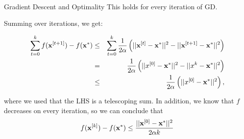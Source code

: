 \documentclass[11pt,compress,t,notes=noshow, xcolor=table]{beamer}
\begin{document}
\begin{vbframe}{Gradient Descent and Optimality}
		This holds for every iteration of GD. 
		
		\framebreak 
		
		Summing over iterations, we get: 
		
		\begin{eqnarray*}
			\sum_{t = 0}^{k} f(\mathbf{x}^{[t+1]}) - f(\mathbf{x}^\ast) &\leq& \sum_{t= 0}^{k} \frac{1}{2 \alpha} \left( ||\mathbf{x}^{[t]}-\mathbf{x}^\ast||^2 - || \mathbf{x}^{[t+1]} - \mathbf{x}^\ast ||^2 \right) \\
			&=& \frac{1}{2 \alpha}  \left( ||x^{[0]}-\mathbf{x}^\ast||^2 - || x^{k} - \mathbf{x}^\ast ||^2 \right) \\
			& \leq & \frac{1}{2 \alpha} \left( ||x^{[0]}-\mathbf{x}^\ast||^2 \right),
		\end{eqnarray*}
	
		where we used that the LHS is a telescoping sum. In addition, we know that $f$ decreases on every iteration, so we can conclude that
		$$
		f(\mathbf{x}^{[k]}) - f(\mathbf{x}^\ast) \leq \frac{|| \mathbf{x}^{[0]} - \mathbf{x}^\ast ||^2}{2\alpha k}
		$$
%		
		
	\end{vbframe}	
	
	\endlecture
\end{document}
